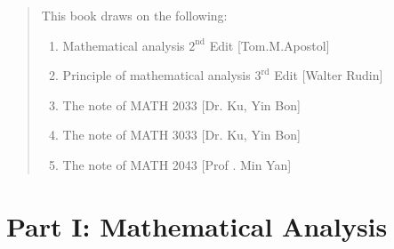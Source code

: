 \documentclass[
	UTF-8,
	11pt, %
	a4paper, %
]{LegrandOrangeBook}
\begin{document}
\begin{quote}
    This book draws on the following:
    \begin{enumerate}
        \item Mathematical analysis $2^{\text{nd}}$ Edit  [Tom.M.Apostol]
        \item Principle of mathematical analysis $3^\text{{rd}}$ Edit [Walter Rudin]
        \item The note of MATH 2033 [Dr. Ku, Yin Bon]
        \item The note of MATH 3033 [Dr. Ku, Yin Bon]
        \item The note of MATH 2043 [Prof . Min Yan]
    \end{enumerate}

\end{quote}





\pagestyle{empty} %

\tableofcontents %



\pagestyle{fancy} %

\cleardoublepage %


\part{Part I: Mathematical Analysis }


\chapterspaceabove{6.75cm} %
\chapterspacebelow{7.25cm} %
\end{document}
